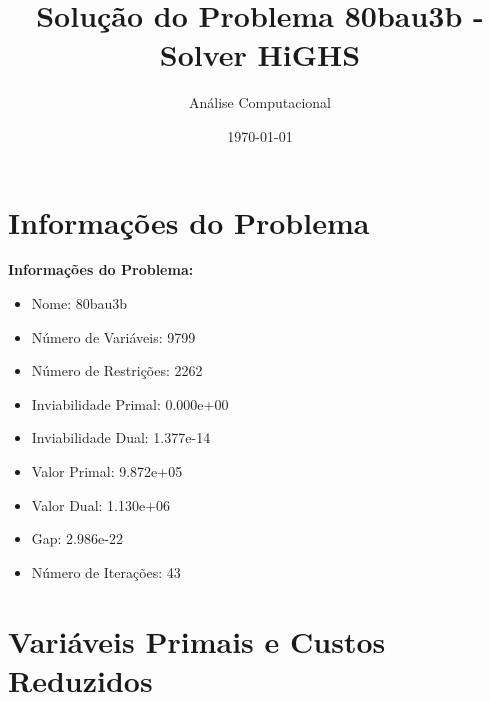 \documentclass[12pt]{article}
\title{Solução do Problema 80bau3b - Solver HiGHS}
\author{Análise Computacional}
\date{\today}
\begin{document}
\maketitle

\section{Informações do Problema}

\textbf{Informações do Problema:}
\begin{itemize}
\item Nome: 80bau3b
\item Número de Variáveis: 9799
\item Número de Restrições: 2262
\item Inviabilidade Primal: 0.000e+00
\item Inviabilidade Dual: 1.377e-14
\item Valor Primal: 9.872e+05
\item Valor Dual: 1.130e+06
\item Gap: 2.986e-22
\item Número de Iterações: 43
\end{itemize}


\section{Variáveis Primais e Custos Reduzidos}
\end{document}
